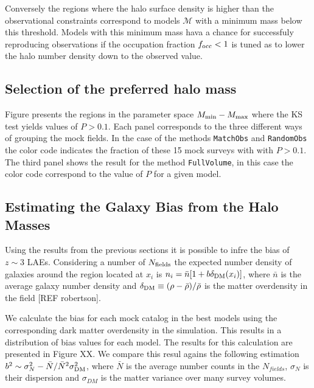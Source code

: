 \documentclass{emulateapj}
\begin{document}
Conversely the regions where the halo surface density is higher than the observational constraints correspond to models ${\mathcal M}$ with a minimum mass below this threshold. Models with this minimum mass hava a chance for successfuly reproducing observations if the occupation fraction $f_{\rm occ}<1$ is tuned as to lower the halo number density down to the observed value. 


\subsection{Selection of the preferred halo mass}

Figure \label{figure:landscape} presents the regions in the parameter space $M_{\rm min}-M_{\rm max}$ where the KS test yields values of $P>0.1$. Each panel corresponds to the three different ways of grouping the mock fields. In the case of the methods {\tt{MatchObs}} and {\tt{RandomObs}} the color code indicates the fraction of these 15 mock surveys with with $P>0.1$. The third panel shows the result for the method {\tt{FullVolume}}, in this case the color code correspond to the value of $P$ for a given model.

\begin{figure}
\begin{center}
\end{center} 
\caption{ \label{figure:landscape} 
}
\end{figure}



\subsection{Estimating the Galaxy Bias from the Halo Masses}
Using the results from the previous sections it is possible to infre the bias of $z\sim 3$ LAEs. Considering a number of $N_{\rm fields}$ the expected number density of galaxies around the region located at $x_{i}$ is $n_{i}=\bar{n}[1+ b\delta_{\rm DM}(x_{i})]$, where $\bar{n}$ is the average galaxy number density and $\delta_{\rm DM}\equiv (\rho - \bar{\rho})/\bar{\rho}$ is the matter overdensity in the field [REF robertson].

We calculate the bias for each mock catalog in the best models using the corresponding dark matter overdensity in the simulation. This results in a distribution of bias values for each model. The results for this calculation are presented in Figure XX.  We compare this resul agains the following estimation $b^{2}\sim {\sigma_{N}^{2} - \bar{N}}/\bar{N}^{2}\sigma_{\rm DM}^{2}$, where $\bar{N}$ is the average number counts in the $N_{fields}$, $\sigma_{N}$ is their dispersion and $\sigma_{DM}$ is the matter variance over many survey volumes.
\end{document}
